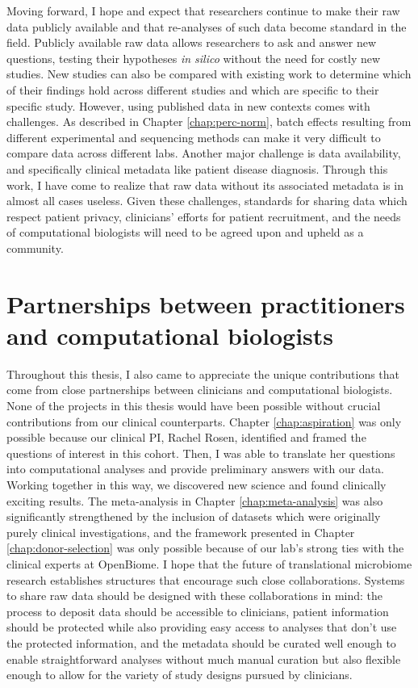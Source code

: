 Moving forward, I hope and expect that researchers continue to make their raw data publicly available and that re-analyses of such data become standard in the field.
Publicly available raw data allows researchers to ask and answer new questions, testing their hypotheses \textit{in silico} without the need for costly new studies.
New studies can also be compared with existing work to determine which of their findings hold across different studies and which are specific to their specific study.
However, using published data in new contexts comes with challenges.
As described in Chapter \ref{chap:perc-norm}, batch effects resulting from different experimental and sequencing methods can make it very difficult to compare data across different labs.
Another major challenge is data availability, and specifically clinical metadata like patient disease diagnosis.
Through this work, I have come to realize that raw data without its associated metadata is in almost all cases useless.
Given these challenges, standards for sharing data which respect patient privacy, clinicians' efforts for patient recruitment, and the needs of computational biologists will need to be agreed upon and upheld as a community.

\section{Partnerships between practitioners and computational biologists}

Throughout this thesis, I also came to appreciate the unique contributions that come from close partnerships between clinicians and computational biologists.
None of the projects in this thesis would have been possible without crucial contributions from our clinical counterparts.
Chapter \ref{chap:aspiration} was only possible because our clinical PI, Rachel Rosen, identified and framed the questions of interest in this cohort.
Then, I was able to translate her questions into computational analyses and provide preliminary answers with our data.
Working together in this way, we discovered new science and found clinically exciting results.
The meta-analysis in Chapter \ref{chap:meta-analysis} was also significantly strengthened by the inclusion of datasets which were originally purely clinical investigations, and the framework presented in Chapter \ref{chap:donor-selection} was only possible because of our lab's strong ties with the clinical experts at OpenBiome.
I hope that the future of translational microbiome research establishes structures that encourage such close collaborations.
Systems to share raw data should be designed with these collaborations in mind: the process to deposit data should be accessible to clinicians, patient information should be protected while also providing easy access to analyses that don't use the protected information, and the metadata should be curated well enough to enable straightforward analyses without much manual curation but also flexible enough to allow for the variety of study designs pursued by clinicians.

